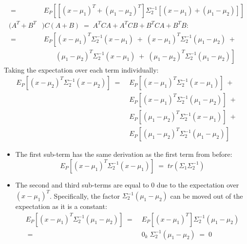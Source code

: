 \documentclass[12pt]{report}
\begin{document}
\begin{itemize}
\begin{align*}
            \;=&\; E_P \left[ \left[(x - \mu_1)^T + (\mu_1 - \mu_2)^T\right]
                \Sigma_2^{-1} [(x - \mu_1) + (\mu_1 - \mu_2)] \right] \\[2.5ex]
            (A^T + B^T&)C(A + B) \;=\; A^TCA + A^TCB + B^TCA + B^TB: \\[2.5ex]
            \;=&\; E_P \left[ (x - \mu_1)^T\Sigma_2^{-1}(x - \mu_1) \;+\;
                (x - \mu_1)^T\Sigma_2^{-1}(\mu_1 - \mu_2) \;+ \right. \\[2ex]
                & \quad\;\;\;\,
                \left. (\mu_1 - \mu_2)^T\Sigma_2^{-1}(x - \mu_1) \;+\; 
                (\mu_1 - \mu_2)^T\Sigma_2^{-1}(\mu_1 - \mu_2) \right]
        \end{align*}
        \clearpage
        Taking the expectation over each term individually:
        \begin{align*}
            E_P \left[ (x - \mu_2)^T\Sigma_2^{-1} (x - \mu_2) \right]
            \;=\; &E_P \left[ (x - \mu_1)^T\Sigma_2^{-1}(x - \mu_1) \right] \;+\\[2ex]
                  &E_P \left[ (x - \mu_1)^T\Sigma_2^{-1}(\mu_1 - \mu_2) \right]\;+\\[2ex]
                  &E_P \left[ (\mu_1 - \mu_2)^T\Sigma_2^{-1}(x - \mu_1) \right]\;+\\[2ex]
                  &E_P \left[ (\mu_1 - \mu_2)^T\Sigma_2^{-1}(\mu_1 - \mu_2) \right]
        \end{align*}
        \begin{itemize}
            \item The first sub-term has the same derivation as the first term from before:
                $$E_P \left[ (x - \mu_1)^T\Sigma_2^{-1}(x - \mu_1) \right] \;=\;
                    tr(\Sigma_1\Sigma_2^{-1})$$
            \item The second and third sub-terms are equal to $0$ due to the expectation
                over $(x - \mu_1)^T$. Specifically, the factor $\Sigma_2^{-1}
                (\mu_1 - \mu_2)$ can be moved out of the expectation as it is a constant:
                \begin{align*}
                    E_P \left[ (x - \mu_1)^T\Sigma_2^{-1}(\mu_1 - \mu_2) \right]
                    \;=&\; E_P \left[ (x - \mu_1)^T \right]
                        \Sigma_2^{-1}(\mu_1 - \mu_2) \\
                    \;=&\; 0_k \; \Sigma_2^{-1}(\mu_1 - \mu_2) \;=\; 0 \\[1.5ex]

\end{align*}
\end{itemize}
\end{itemize}
\end{document}
